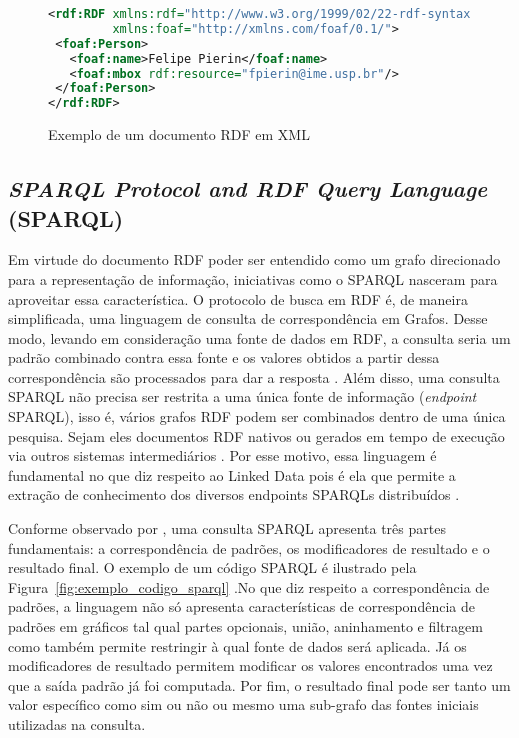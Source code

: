 \begin{figure}[!ht]
    \begin{lstlisting}[language=XML]
<rdf:RDF xmlns:rdf="http://www.w3.org/1999/02/22-rdf-syntax-ns#"
         xmlns:foaf="http://xmlns.com/foaf/0.1/">
 <foaf:Person>
   <foaf:name>Felipe Pierin</foaf:name>
   <foaf:mbox rdf:resource="fpierin@ime.usp.br"/>
 </foaf:Person>
</rdf:RDF>
    \end{lstlisting}
    \caption{Exemplo de um documento RDF em XML}
    \label{fig:exemplo_codigo_rdf} 
\end{figure}

\subsection{\emph{SPARQL Protocol and RDF Query Language} (SPARQL)}
\label{sec:sparql}

Em virtude do documento RDF poder ser entendido como um grafo direcionado para a representação de informação, iniciativas como o SPARQL nasceram para aproveitar essa característica. O protocolo de busca em RDF é, de maneira simplificada, uma linguagem de consulta de correspondência em Grafos. Desse modo, levando em consideração uma fonte de dados em RDF, a consulta seria um padrão combinado contra essa fonte e os valores obtidos a partir dessa correspondência são processados para dar a resposta \citep{Perez2006}. Além disso, uma consulta SPARQL não precisa ser restrita a uma única fonte de informação (\emph{endpoint} SPARQL), isso é, vários grafos RDF podem ser combinados dentro de uma única pesquisa. Sejam eles documentos RDF nativos ou gerados em tempo de execução via outros sistemas intermediários \citep{W3C_SPARQL}. Por esse motivo, essa linguagem é fundamental no que diz respeito ao Linked Data pois é ela que permite a extração de conhecimento dos diversos endpoints SPARQLs distribuídos \citep{Singh2010}.

Conforme observado por \citet{Perez2006}, uma consulta SPARQL apresenta três partes fundamentais: a correspondência de padrões, os modificadores de resultado e o resultado final. O exemplo de um código SPARQL é ilustrado pela Figura~\ref{fig:exemplo_codigo_sparql} .No que diz respeito a correspondência de padrões, a linguagem não só apresenta características de correspondência de padrões em gráficos tal qual partes opcionais, união, aninhamento e filtragem como também permite restringir à qual fonte de dados será aplicada. Já os modificadores de resultado permitem modificar os valores encontrados uma vez que a saída padrão já foi computada. Por fim, o resultado final pode ser tanto um valor específico como sim ou não ou mesmo uma sub-grafo das fontes iniciais utilizadas na consulta.

